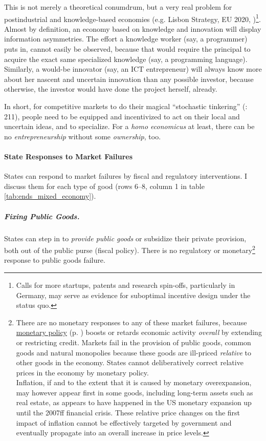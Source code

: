 This is not merely a theoretical conumdrum, but a very real problem for postindustrial  and knowledge-based economies (e.g. Lisbon Strategy, EU 2020, \citealt{Bell-1973-aa})\footnote{
	Calls for more startups, patents and research spin-offs, particularly in Germany, may serve as evidence for suboptimal incentive design under the status quo.}. 
Almost by definition, an economy based on knowledge and innovation will display information asymmetries. The effort a knowledge worker (say, a programmer) puts in, cannot easily be observed, because that would require the principal to acquire the exact same specialized knowledge (say, a programming language). Similarly, a would-be innovator (say, an \gls{ICT} entrepreneur) will always know more about her nascent and uncertain innovation than any possible investor, because otherwise, the investor would have done the project herself, already. 

In short, for competitive markets to do their magical ``stochastic tinkering'' (\citealt{Taleb2007}: 211), people need to be equipped and incentivized to act on their local and uncertain ideas, and to specialize. For a \emph{homo economicus} at least, there can be no \emph{entrepreneurship} without some \emph{ownership}, too.	

\paragraph{State Responses to Market Failures}  \label{sec:state_responses} States can respond to market failures by fiscal and regulatory interventions. I discuss them for each type of good (rows 6--8, column 1 in table \ref{tab:ends_mixed_economy}).

\subparagraph{Fixing Public Goods.}  \label{sec:public_good_response} States can step in to \emph{provide public goods} or subsidize their private provision, both out of the public purse (fiscal policy). There is no regulatory or monetary\footnote{
	\label{fn:monetary_commons}There are no monetary responses to any of these market failures, because \hyperref[sec:monetary]{monetary policy} (p.  \pageref{sec:monetary}) boosts or retards economic activity \emph{overall} by extending or restricting credit. Markets fail in the provision of public goods, common goods and natural monopolies because these goods are ill-priced \emph{relative} to other goods in the economy. States cannot deliberatively correct relative prices in the economy by monetary policy. \\
	Inflation, if and to the extent that it is caused by monetary overexpansion, may however appear first in some goods, including long-term assets such as real estate, as appears to have happened in the US monetary expansion up until the 2007ff financial crisis. These relative price changes on the first impact of inflation cannot be effectively targeted by government and eventually propagate into an overall increase in price levels.} %
response to public goods failure.

